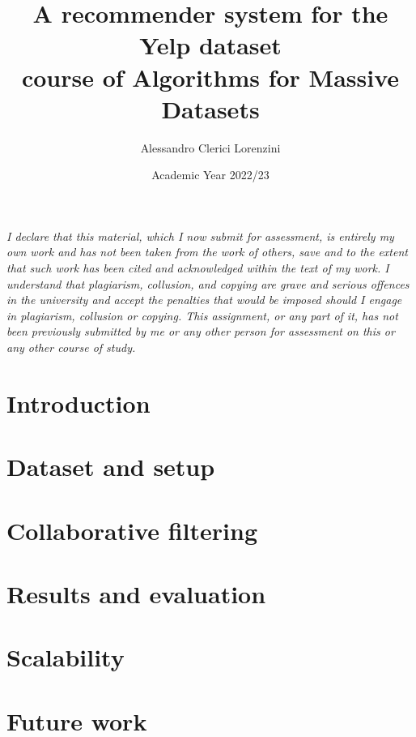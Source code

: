 \documentclass[11pt,a4paper]{article}
\title{A recommender system for the Yelp dataset\\
{\small course of Algorithms for Massive Datasets}}
\author{Alessandro Clerici Lorenzini}
\date{Academic Year 2022/23}
\begin{document}
\maketitle

\begin{multicols}{2}


\textit{I declare that this material, which I now submit for assessment, is entirely my own work and has not been taken from the work of others, save and to the extent that such work has been cited and acknowledged within the text of my work. I understand that plagiarism, collusion, and copying are grave and serious offences in the university and accept the penalties that would be imposed should I engage in plagiarism, collusion or copying. This assignment, or any part of it, has not been previously submitted by me or any other person for assessment on this or any other course of study.}



\section{Introduction}



\section{Dataset and setup}



\section{Collaborative filtering}



\section{Results and evaluation}



\section{Scalability}



\section{Future work}


\end{multicols}
\end{document}
